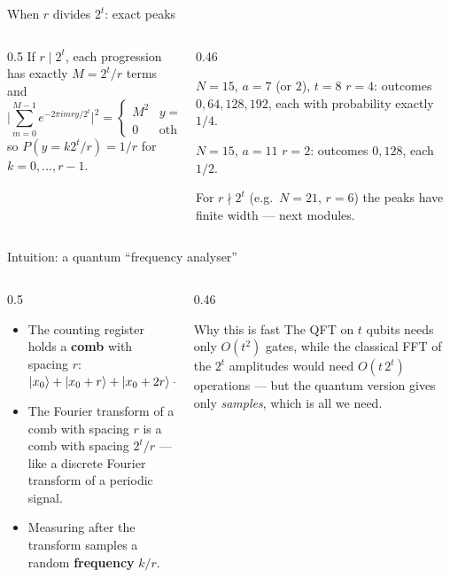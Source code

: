 \documentclass[aspectratio=169,11pt]{beamer}
\newcommand{\key}[1]{{\color{qdark}\textbf{#1}}}
\begin{document}
\begin{frame}[label=fPFExact]{When $r$ divides $2^t$: exact peaks}
  \begin{columns}[T]
    \begin{column}{0.5\textwidth}
      \small
      If $r \mid 2^t$, each progression has exactly $M = 2^t/r$ terms and
      \[ \Big|\sum_{m=0}^{M-1}e^{-2\pi imry/2^t}\Big|^2 = \begin{cases}M^2 & y = k2^t/r\\ 0 & \text{otherwise}\end{cases} \]
      so $P(y = k2^t/r) = 1/r$ for $k = 0, \dots, r - 1$.
    \end{column}
    \begin{column}{0.46\textwidth}
      \begin{exampleblock}{$N = 15$, $a = 7$ (or $2$), $t = 8$}
        \small $r = 4$: outcomes $0, 64, 128, 192$, each with probability exactly $1/4$.
      \end{exampleblock}
      \begin{exampleblock}{$N = 15$, $a = 11$}
        \small $r = 2$: outcomes $0, 128$, each $1/2$.
      \end{exampleblock}
      \scriptsize\color{qgrey} For $r \nmid 2^t$ (e.g.\ $N = 21$, $r = 6$) the peaks have finite width --- next modules.
    \end{column}
  \end{columns}
\end{frame}

\begin{frame}[label=fPFIntuition]{Intuition: a quantum ``frequency analyser''}
  \small
  \begin{columns}[T]
    \begin{column}{0.5\textwidth}
      \begin{itemize}\itemsep2pt
        \item The counting register holds a \key{comb} with spacing $r$: $\ket{x_0} + \ket{x_0 + r} + \ket{x_0 + 2r} + \cdots$
        \item The Fourier transform of a comb with spacing $r$ is a comb with spacing $2^t/r$ --- like a discrete Fourier transform of a periodic signal.
        \item Measuring after the transform samples a random \key{frequency} $k/r$.
      \end{itemize}
    \end{column}
    \begin{column}{0.46\textwidth}
      \begin{block}{Why this is fast}
        \small The QFT on $t$ qubits needs only $O(t^2)$ gates, while the classical FFT of the $2^t$ amplitudes would need $O(t\,2^t)$ operations ---
        but the quantum version gives only \emph{samples}, which is all we need.
      \end{block}
    \end{column}
  \end{columns}
\end{frame}
\end{document}
